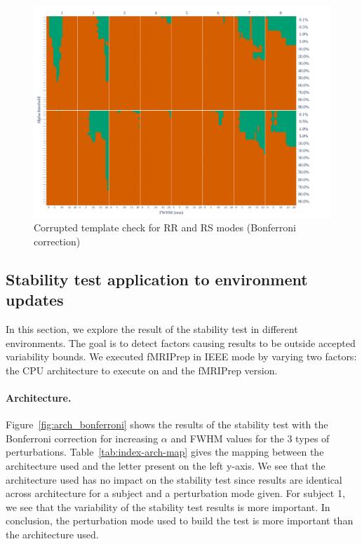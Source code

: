 \documentclass[lettersize,journal]{IEEEtran}
\newcommand{\fmriprep}{fMRIPrep\xspace}
\begin{document}
\begin{figure}
    \centering
    \includegraphics[width=\linewidth]{figures/template/template_fwe_bonferroni.pdf}
    \caption{Corrupted template check for RR and RS modes (Bonferroni correction)}
    \label{fig:template_bonferroni}
\end{figure}

\subsection{Stability test application to environment updates}

In this section, we explore the result of the stability test in different environments. The goal is to detect factors causing results to be outside accepted variability bounds. We executed \fmriprep in IEEE mode by varying two factors: the CPU architecture to execute on and the \fmriprep version.

\paragraph*{Architecture.} Figure~\ref{fig:arch_bonferroni} shows the results of the stability test with the Bonferroni correction for increasing $\alpha$ and FWHM values for the 3 types of perturbations. Table~\ref{tab:index-arch-map} gives the mapping between the architecture used and the letter present on the left y-axis. We see that the architecture used has no impact on the stability test since results are identical across architecture for a subject and a perturbation mode given. For subject 1, we see that the variability of the stability test results is more important. In conclusion, the perturbation mode used to build the test is more important than the architecture used.
\end{document}
